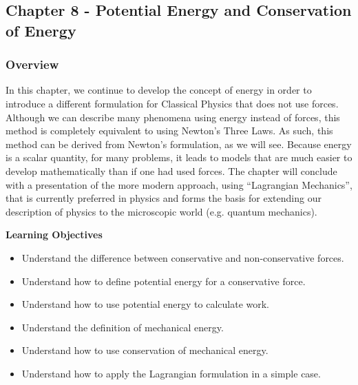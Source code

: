 \subsection{Chapter 8 - Potential Energy and Conservation of Energy}

\subsubsection{Overview}\label{chapter:potentialecons}

In this chapter, we continue to develop the concept of energy in order to introduce a different formulation for Classical Physics that does not use forces. Although we can describe many phenomena using energy instead of forces, this method is completely equivalent to using Newton's Three Laws. As such, this method can be derived from Newton's formulation, as we will see. Because energy is a scalar quantity, for many problems, it leads to models that are much easier to develop mathematically than if one had used forces. The chapter will conclude with a presentation of the more modern approach, using ``Lagrangian Mechanics'', that is currently preferred in physics and forms the basis for extending our description of physics to the microscopic world (e.g. quantum mechanics).

\begin{framed}
\textbf{Learning Objectives}\\
\begin{itemize}
\item Understand the difference between conservative and non-conservative forces.
\item Understand how to define potential energy for a conservative force.
\item Understand how to use potential energy to calculate work.
\item Understand the definition of mechanical energy.
\item Understand how to use conservation of mechanical energy.
\item Understand how to apply the Lagrangian formulation in a simple case.
\end{itemize}
\end{framed}

